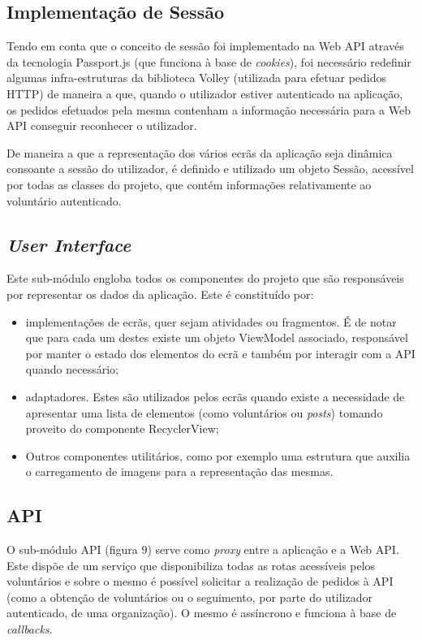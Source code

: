 \subsection{Implementação de Sessão}

Tendo em conta que o conceito de sessão foi implementado na Web API através da tecnologia Passport.js (que funciona à base de \textit{cookies}), foi necessário redefinir algumas infra-estruturas da biblioteca Volley (utilizada para efetuar pedidos HTTP) de maneira a que, quando o utilizador estiver autenticado na aplicação, os pedidos efetuados pela mesma contenham a informação necessária para a Web API conseguir reconhecer o utilizador.

\medskip

De maneira a que a representação dos vários ecrãs da aplicação seja dinâmica consoante a sessão do utilizador, é definido e utilizado um objeto Sessão, acessível por todas as classes do projeto, que contém informações relativamente ao voluntário autenticado.

\subsection{\textit{User Interface}}

Este sub-módulo engloba todos os componentes do projeto que são responsáveis por representar os dados da aplicação. Este é constituído por:

\begin{itemize}
	\item implementações de ecrãs, quer sejam atividades ou fragmentos. É de notar que para cada um destes existe um objeto ViewModel associado, responsável por manter o estado dos elementos do ecrã e também por interagir com a API quando necessário; 
	\item adaptadores. Estes são utilizados pelos ecrãs quando existe a necessidade de apresentar uma lista de elementos (como voluntários ou \textit{posts}) tomando proveito do componente RecyclerView;
	\item Outros componentes utilitários, como por exemplo uma estrutura que auxilia o carregamento de imagens para a representação das mesmas.
\end{itemize} 

\subsection{API}

O sub-módulo API (figura 9) serve como \textit{proxy} entre a aplicação e a Web API. Este dispõe de um serviço que disponibiliza todas as rotas acessíveis pelos voluntários e sobre o mesmo é possível solicitar a realização de pedidos à API (como a obtenção de voluntários ou o seguimento, por parte do utilizador autenticado, de uma organização). O mesmo é assíncrono e funciona à base de \textit{callbacks}.

